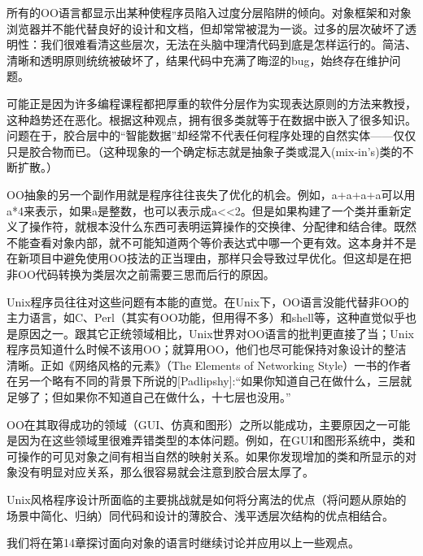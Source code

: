 \documentclass[11pt,oneside]{book}
\begin{document}
\begin{common-format}
所有的OO语言都显示出某种使程序员陷入过度分层陷阱的倾向。对象框架和对象浏览器并不能代替良好的设计和文档，但却常常被混为一谈。过多的层次破坏了透明性：我们很难看清这些层次，无法在头脑中理清代码到底是怎样运行的。简洁、清晰和透明原则统统被破坏了，结果代码中充满了晦涩的bug，始终存在维护问题。

可能正是因为许多编程课程都把厚重的软件分层作为实现表达原则的方法来教授，这种趋势还在恶化。根据这种观点，拥有很多类就等于在数据中嵌入了很多知识。问题在于，胶合层中的“智能数据”却经常不代表任何程序处理的自然实体——仅仅只是胶合物而已。（这种现象的一个确定标志就是抽象子类或混入(mix-in's)类的不断扩散。）

OO抽象的另一个副作用就是程序往往丧失了优化的机会。例如，a+a+a+a可以用a*4来表示，如果a是整数，也可以表示成a<<2。但是如果构建了一个类并重新定义了操作符，就根本没什么东西可表明运算操作的交换律、分配律和结合律。既然不能查看对象内部，就不可能知道两个等价表达式中哪一个更有效。这本身并不是在新项目中避免使用OO技法的正当理由，那样只会导致过早优化。但这却是在把非OO代码转换为类层次之前需要三思而后行的原因。

Unix程序员往往对这些问题有本能的直觉。在Unix下，OO语言没能代替非OO的主力语言，如C、Perl（其实有OO功能，但用得不多）和shell等，这种直觉似乎也是原因之一。跟其它正统领域相比，Unix世界对OO语言的批判更直接了当；Unix程序员知道什么时候不该用OO；就算用OO，他们也尽可能保持对象设计的整洁清晰。正如《网络风格的元素》（The Elements of Networking Style）一书的作者在另一个略有不同的背景下所说的[Padlipshy]:“如果你知道自己在做什么，三层就足够了；但如果你不知道自己在做什么，十七层也没用。”

OO在其取得成功的领域（GUI、仿真和图形）之所以能成功，主要原因之一可能是因为在这些领域里很难弄错类型的本体问题。例如，在GUI和图形系统中，类和可操作的可见对象之间有相当自然的映射关系。如果你发现增加的类和所显示的对象没有明显对应关系，那么很容易就会注意到胶合层太厚了。

Unix风格程序设计所面临的主要挑战就是如何将分离法的优点（将问题从原始的场景中简化、归纳）同代码和设计的薄胶合、浅平透层次结构的优点相结合。

我们将在第14章探讨面向对象的语言时继续讨论并应用以上一些观点。



\end{common-format}
\end{document}
